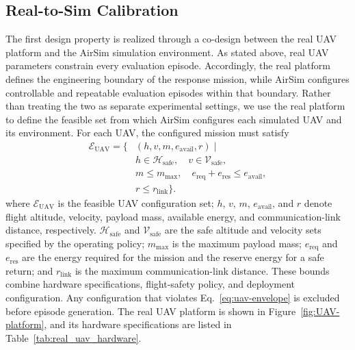 \subsection{Real-to-Sim Calibration}
\label{subsec:real-to-sim-calibration}
The first design property is realized through a co-design between the real UAV
platform and the AirSim simulation environment. As stated above, real UAV
parameters constrain every evaluation episode. Accordingly, the real platform defines the
engineering boundary of the response mission, while AirSim configures controllable
and repeatable evaluation episodes within that boundary. Rather than treating the two as
separate experimental settings, we use the real platform to define the feasible
set from which AirSim configures each simulated UAV and its environment.
For each UAV, the configured mission must satisfy
\begin{equation}
\begin{aligned}
\mathcal{E}_{\mathrm{UAV}}=\{&(h,v,m,e_{\mathrm{avail}},r)\mid\\
    &h\in \mathcal{H}_{\mathrm{safe}},\quad
      v\in \mathcal{V}_{\mathrm{safe}},\\
    &m\leq m_{\max},\quad
      e_{\mathrm{req}}+e_{\mathrm{res}}\leq e_{\mathrm{avail}},\\
    &r\leq r_{\mathrm{link}}\}.
\end{aligned}
\label{eq:uav-envelope}
\end{equation}
where $\mathcal{E}_{\mathrm{UAV}}$ is the feasible UAV configuration set;
$h$, $v$, $m$, $e_{\mathrm{avail}}$, and $r$ denote flight altitude, velocity,
payload mass, available energy, and communication-link distance,
respectively. $\mathcal{H}_{\mathrm{safe}}$ and
$\mathcal{V}_{\mathrm{safe}}$ are the safe altitude and velocity sets specified
by the operating policy; $m_{\max}$ is the maximum payload mass;
$e_{\mathrm{req}}$ and $e_{\mathrm{res}}$ are the energy required for the
mission and the reserve energy for a safe return; and $r_{\mathrm{link}}$ is the
maximum communication-link distance. These bounds combine hardware
specifications, flight-safety policy, and deployment configuration. Any
configuration that violates
Eq.~\ref{eq:uav-envelope} is excluded before episode generation. The real UAV
platform is shown in Figure~\ref{fig:UAV-platform}, and its hardware
specifications are listed in Table~\ref{tab:real_uav_hardware}.



